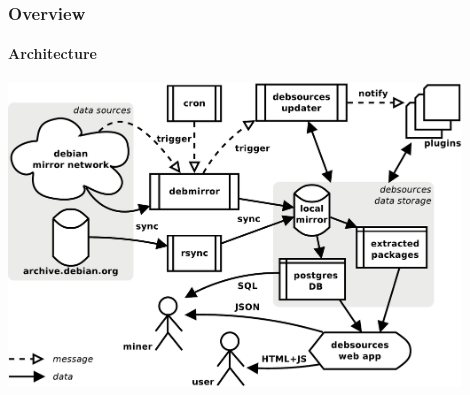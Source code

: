 \documentclass{beamer}
\begin{document}
\begin{frame}
  \frametitle{Overview}
  \framesubtitle{Architecture}
  \begin{center}
    \includegraphics[width=0.9\textwidth]{img/architecture}
  \end{center}
\end{frame}
\end{document}
